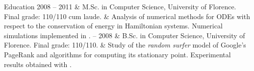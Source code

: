 \begin{cvsection}{Education}
2008 -- 2011 & M.Sc. in Computer Science, University of Florence. Final grade: 110/110 cum laude.\spacednewline
	& Analysis of numerical methods for ODEs with respect to the conservation of energy in Hamiltonian systems. Numerical simulations implemented in . -- 2008 & B.Sc. in Computer Science, University of Florence. Final grade: 110/110.\spacednewline
	& Study of the \emph{random surfer} model of Google's PageRank and algorithms for computing its stationary point. Experimental results obtained with .
\end{cvsection}